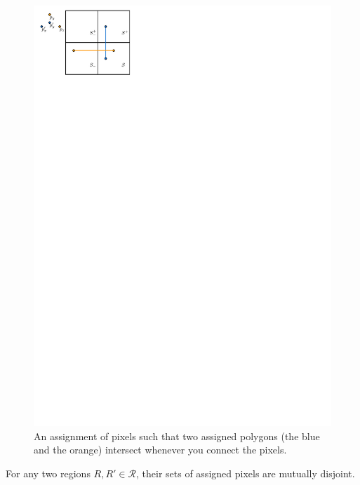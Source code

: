 \documentclass[a4paper,UKenglish,cleveref]{lipics-v2019}
\begin{document}
\begin{figure}[tb]
\centering
\includegraphics[]{intersection.pdf}
\caption{An assignment of pixels such that two assigned polygons (the blue and the orange) intersect whenever you connect the pixels. }
\label{fig:intersection}
\end{figure}

\begin{lemma}
For any two regions $R, R' \in \mathcal{R}$, their sets of assigned pixels are mutually disjoint.
\end{lemma}
\end{document}
